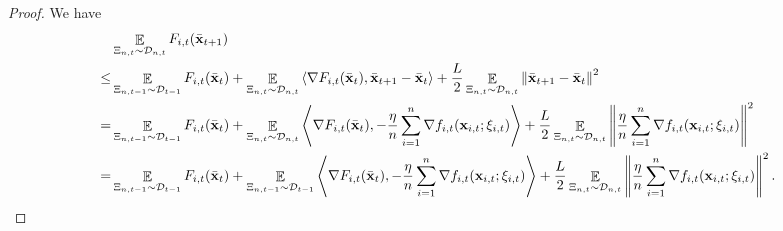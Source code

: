 \documentclass{article}
\begin{document}
\begin{proof}
We have
\begin{align}
\nonumber
& \mathop{\mathbb{E}}_{ \Xi_{n,t} \sim \mathcal{D}_{n,t} } F_{i,t}(\bar{{\bf x}}_{t+1}) \\ \nonumber
\le & \mathop{\mathbb{E}}_{ \Xi_{n,t-1} \sim \mathcal{D}_{t-1} } F_{i,t}(\bar{{\bf x}}_t) + \mathop{\mathbb{E}}_{ \Xi_{n,t} \sim \mathcal{D}_{n,t} }\left\langle\nabla F_{i,t}(\bar{{\bf x}}_t), \bar{{\bf x}}_{t+1} - \bar{{\bf x}}_t \right\rangle + \frac{L}{2}\mathop{\mathbb{E}}_{ \Xi_{n,t} \sim \mathcal{D}_{n,t} }\left\lVert\bar{{\bf x}}_{t+1} - \bar{{\bf x}}_t\right\rVert^2 \\ \nonumber
= & \mathop{\mathbb{E}}_{ \Xi_{n,t-1} \sim \mathcal{D}_{t-1} } F_{i,t}(\bar{{\bf x}}_t) + \mathop{\mathbb{E}}_{ \Xi_{n,t} \sim \mathcal{D}_{n,t} }\left\langle\nabla F_{i,t}(\bar{{\bf x}}_t), -\frac{\eta}{n}\sum_{i=1}^n \nabla f_{i,t}({\bf x}_{i,t};\xi_{i,t}) \right\rangle + \frac{L}{2} \mathop{\mathbb{E}}_{ \Xi_{n,t} \sim \mathcal{D}_{n,t} }\left\lVert\frac{\eta}{n}\sum_{i=1}^n \nabla f_{i,t}({\bf x}_{i,t};\xi_{i,t})\right\rVert^2 \\ \label{equa_Lemma_gradient_norm_temp0}
= & \mathop{\mathbb{E}}_{ \Xi_{n,t-1} \sim \mathcal{D}_{t-1} } F_{i,t}(\bar{{\bf x}}_t) + \mathop{\mathbb{E}}_{ \Xi_{n,t-1} \sim \mathcal{D}_{t-1} }\left\langle\nabla F_{i,t}(\bar{{\bf x}}_t), -\frac{\eta}{n}\sum_{i=1}^n \nabla f_{i,t}({\bf x}_{i,t};\xi_{i,t}) \right\rangle + \frac{L}{2} \mathop{\mathbb{E}}_{ \Xi_{n,t} \sim \mathcal{D}_{n,t} }\left\lVert\frac{\eta}{n}\sum_{i=1}^n \nabla f_{i,t}({\bf x}_{i,t};\xi_{i,t})\right\rVert^2.
\end{align}



\end{proof}
\end{document}
